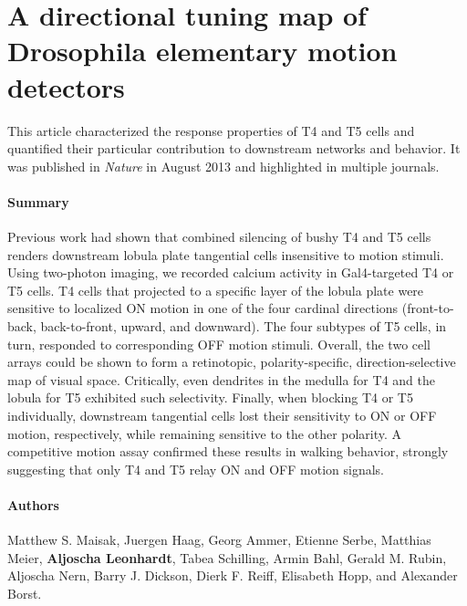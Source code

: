 \section{A directional tuning map of Drosophila elementary motion detectors}
\label{sct:manuscript_maisak}

This article characterized the response properties of T4 and T5 cells and quantified their particular contribution to downstream networks and behavior. It was published in \textit{Nature} in August 2013 and highlighted in multiple journals.

\paragraph{Summary}
Previous work had shown that combined silencing of bushy T4 and T5 cells renders downstream lobula plate tangential cells insensitive to motion stimuli. Using two-photon imaging, we recorded calcium activity in Gal4-targeted T4 or T5 cells. T4 cells that projected to a specific layer of the lobula plate were sensitive to localized ON motion in one of the four cardinal directions (front-to-back, back-to-front, upward, and downward). The four subtypes of T5 cells, in turn, responded to corresponding OFF motion stimuli. Overall, the two cell arrays could be shown to form a retinotopic, polarity-specific, direction-selective map of visual space. Critically, even dendrites in the medulla for T4 and the lobula for T5 exhibited such selectivity. Finally, when blocking T4 or T5 individually, downstream tangential cells lost their sensitivity to ON or OFF motion, respectively, while remaining sensitive to the other polarity. A competitive motion assay confirmed these results in walking behavior, strongly suggesting that only T4 and T5 relay ON and OFF motion signals.

\paragraph{Authors}
Matthew S. Maisak, Juergen Haag, Georg Ammer, Etienne Serbe, Matthias Meier, \textbf{Aljoscha Leonhardt}, Tabea Schilling, Armin Bahl, Gerald M. Rubin, Aljoscha Nern, Barry J. Dickson, Dierk F. Reiff, Elisabeth Hopp, and Alexander Borst.

